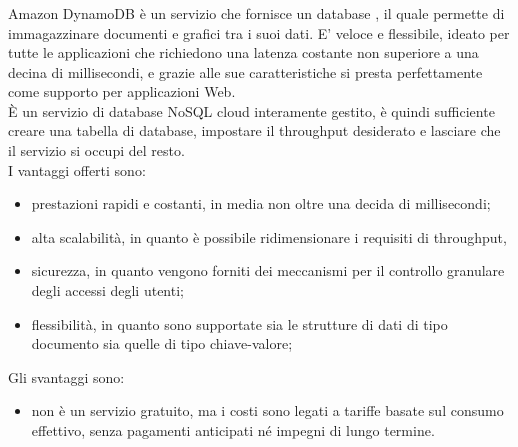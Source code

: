 \subsubsection{}
Amazon DynamoDB è un servizio che fornisce un database , il quale permette di immagazzinare documenti e grafici tra i suoi dati. E' veloce e flessibile, ideato per tutte le applicazioni che richiedono una latenza costante non superiore a una decina di millisecondi, e grazie alle sue caratteristiche si presta perfettamente come supporto per applicazioni Web.\\
È un servizio di database NoSQL cloud interamente gestito, è quindi sufficiente creare una tabella di database, impostare il throughput desiderato e lasciare che il servizio si occupi del resto. \\
I vantaggi offerti sono:
\begin{itemize}
	\item prestazioni rapidi e costanti, in media non oltre una decida di millisecondi;
	\item alta scalabilità, in quanto è possibile ridimensionare i requisiti di throughput,
	\item sicurezza, in quanto vengono forniti dei meccanismi per il controllo granulare degli accessi degli utenti;
	\item flessibilità, in quanto sono supportate sia le strutture di dati di tipo documento sia quelle di tipo chiave-valore;
\end{itemize}
Gli svantaggi sono:
\begin{itemize}
	\item non è un servizio gratuito, ma i costi sono legati a tariffe basate sul consumo effettivo, senza pagamenti anticipati né impegni di lungo termine.
\end{itemize}
